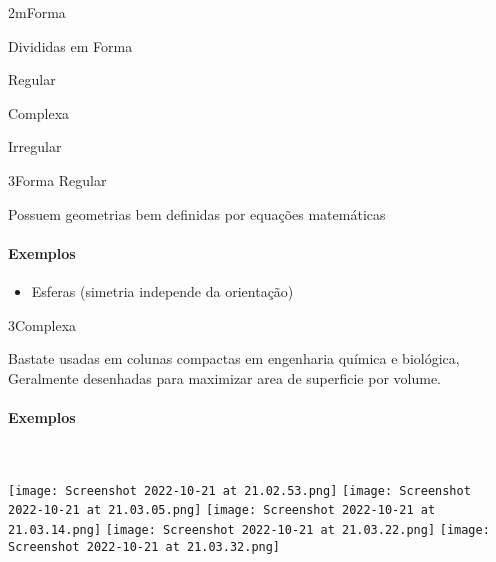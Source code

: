 \documentclass["./OSF-Slides_annotations.tex"]{subfiles}
\begin{document}
\begin{sectionBox}2m{Forma} %
    
    Divididas em Forma
    \begin{itemize}
        \begin{multicols}{3}
            \item Regular
            \item Complexa
            \item Irregular
        \end{multicols}
    \end{itemize}

    \begin{sectionBox}3{Forma Regular} %
        
        Possuem geometrias bem definidas por equações matemáticas

        \paragraph*{Exemplos}
        \begin{itemize}
            \item Esferas (simetria independe da orientação)
        \end{itemize}
        
    \end{sectionBox}

    \begin{sectionBox}3{Complexa} %
        
        Bastate usadas em colunas compactas em engenharia química e biológica,
        Geralmente desenhadas para maximizar area de superficie por volume.

        \paragraph*{Exemplos}\ 
        \begin{multicols}{4}\centering
                \texttt{[image: Screenshot 2022-10-21 at 21.02.53.png]}
                \texttt{[image: Screenshot 2022-10-21 at 21.03.05.png]}
                \texttt{[image: Screenshot 2022-10-21 at 21.03.14.png]}
                \texttt{[image: Screenshot 2022-10-21 at 21.03.22.png]}
                \texttt{[image: Screenshot 2022-10-21 at 21.03.32.png]}
        \end{multicols}
        

\end{sectionBox}
\end{sectionBox}
\end{document}
